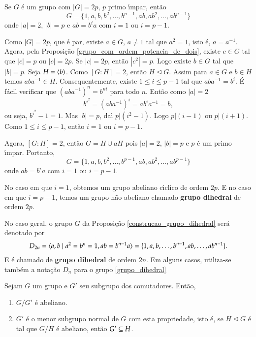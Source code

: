 \begin{proposicao}\label{construcao_grupo_dihedral}
	Se $G$ \'e um grupo com $|G| = 2p$, $p$ primo {\'\i}mpar, ent\~ao
	\[
		G = \{1, a, b, b^2, \dots, b^{p - 1}, ab, ab^2, \dots, ab^{p - 1}\}
	\]
	onde $|a| = 2$, $|b| = p$ e $ab = b^ia$ com $i = 1$ ou $i = p - 1$.
\end{proposicao}
\begin{prova}
	Como $|G| = 2p$, que \'e par, existe $a \in G$, $a \ne 1$ tal que $a^2 = 1$, isto \'e, $a = a^{-1}$. Agora, pela Proposi\c{c}\~ao \ref{grupo_com_ordem_potencia_de_dois}, existe $c \in G$ tal que $|c| = p$ ou $|c| = 2p$. Se $|c| = 2p$, ent\~ao $|c^2| = p$. Logo existe $b \in G$ tal que $|b| = p$. Seja $H = \langle{b}\rangle$. Como $[G:H] = 2$, ent\~ao $H \unlhd G$. Assim para $a \in G$ e $b \in H$ temos $aba^{-1} \in H$. Consequentemente, existe $1 \le i \le p - 1$ tal que $aba^{-1} = b^i$. \'E f\'acil verificar que $(aba^{-1})^n = b^{ni}$ para todo $n$. Ent\~ao como $|a| = 2$
	\[
		b^{i^2} = (aba^{-1})^i = ab^ia^{-1} = b,
	\]
	ou seja, $b^{i^2} - 1 = 1$. Mas $|b| = p$, da{\'\i} $p | (i^2 - 1)$. Logo $p | (i - 1)$ ou $p | (i + 1)$. Como $1 \le i \le p - 1$, ent\~ao $i = 1$ ou $i = p - 1$.

	Agora, $[G:H] = 2$, ent\~ao $G = H \cup aH$ pois $|a| = 2$, $|b| = p$ e $p$ \'e um primo {\'\i}mpar. Portanto,
	\[
		G = \{1, a, b, b^2, \dots, b^{p - 1}, ab, ab^2, \dots, ab^{p - 1}\}	
	\]
	onde $ab = b^ia$ com $i = 1$ ou $i = p - 1$.
\end{prova}

\begin{observacao}
	No caso em que $i = 1$, obtemos um grupo abeliano c{\'\i}clico de ordem $2p$. E no caso em que $i = p - 1$, temos um grupo n\~ao abeliano chamado \textbf{grupo dihedral} de ordem $2p$.
\end{observacao}

\begin{notacao}
	No caso geral, o grupo $G$ da Proposi\c{c}\~ao \ref{construcao_grupo_dihedral} ser\'a denotado por
	\begin{align}\label{grupo_dihedral}
		D_{2n} = \langle{a,b \mid a^2 = b^n = 1, ab = b^{n - 1}a}\rangle = \{1,a,b,\dots, b^{n - 1}, ab, \dots, ab^{n - 1}\}.
	\end{align}
	E \'e chamado de \textbf{grupo dihedral} de ordem $2n$. Em alguns casos, utiliza-se tamb\'em a nota\c{c}\~ao $D_n$ para o grupo \eqref{grupo_dihedral}
\end{notacao}

\begin{proposicao}
	Sejam $G$ um grupo e $G'$ seu subgrupo dos comutadores. Ent\~ao,
	\begin{enumerate}[label=({\roman*})]
		\item $G/G'$ \'e abeliano.
		\item $G'$ \'e o menor subgrupo normal de $G$ com esta propriedade, isto \'e, se $H \unlhd G$ \'e tal que $G/H$ \'e abeliano, ent\~ao $G'\subseteq H$.
	\end{enumerate}
\end{proposicao}


